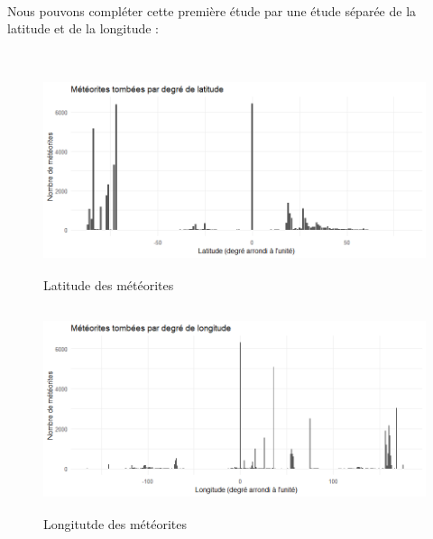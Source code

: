 \documentclass[12pt]{article}
\begin{document}
\\
Nous pouvons compléter cette première étude par une étude séparée de la latitude et de la longitude :\\
\\
\begin{figure}[H]
\centering
\includegraphics[width=16cm,height=6cm]{Images/exploration/histogramme_latitude.png}
\caption{Latitude des météorites}
\end{figure}
\begin{figure}[H]
\centering
\includegraphics[width=16cm,height=6cm]{Images/exploration/histogramme_longitude.png}
\caption{Longitutde des météorites}
\end{figure}
\end{document}
